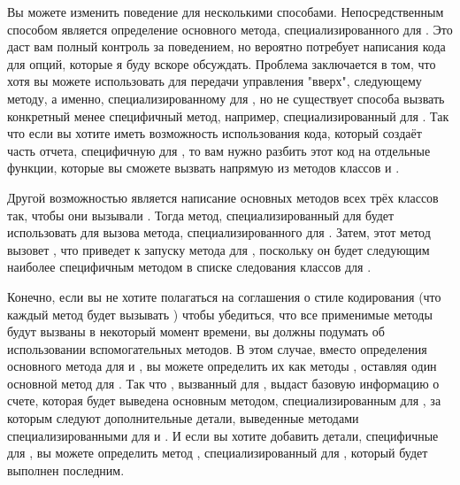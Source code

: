 Вы можете изменить поведение  для 
несколькими способами.  Непосредственным способом является определение основного метода,
специализированного для .  Это даст вам полный контроль за
поведением, но вероятно потребует написания кода для опций, которые я буду вскоре
обсуждать.  Проблема заключается в том, что хотя вы можете использовать
 для передачи управления "вверх", следующему методу, а именно,
специализированному для , но не существует способа вызвать
конкретный менее специфичный метод, например, специализированный для
.  Так что если вы хотите иметь возможность использования кода,
который создаёт часть отчета, специфичную для , то вам нужно разбить
этот код на отдельные функции, которые вы сможете вызвать напрямую из методов
 классов  и .

Другой возможностью является написание основных методов всех трёх классов так, чтобы они
вызывали .  Тогда метод, специализированный для
 будет использовать  для вызова метода,
специализированного для .  Затем, этот метод вызовет
, что приведет к запуску метода для ,
поскольку он будет следующим наиболее специфичным методом в списке следования классов для
.

Конечно, если вы не хотите полагаться на соглашения о стиле кодирования (что каждый метод
будет вызывать ) чтобы убедиться, что все применимые методы будут
вызваны в некоторый момент времени, вы должны подумать об использовании вспомогательных
методов.  В этом случае, вместо определения основного метода  для
 и , вы можете определить их как методы
, оставляя один основной метод для .  Так что
, вызванный для , выдаст базовую
информацию о счете, которая будет выведена основным методом, специализированным для
, за которым следуют дополнительные детали, выведенные методами
 специализированными для  и . И
если вы хотите добавить детали, специфичные для , вы можете
определить метод , специализированный для ,
который будет выполнен последним.

